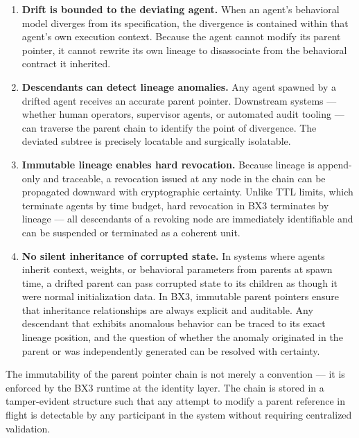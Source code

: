 \begin{enumerate}
    \item \textbf{Drift is bounded to the deviating agent.} When an agent's behavioral model diverges from its specification, the divergence is contained within that agent's own execution context. Because the agent cannot modify its parent pointer, it cannot rewrite its own lineage to disassociate from the behavioral contract it inherited.
    \item \textbf{Descendants can detect lineage anomalies.} Any agent spawned by a drifted agent receives an accurate parent pointer. Downstream systems — whether human operators, supervisor agents, or automated audit tooling — can traverse the parent chain to identify the point of divergence. The deviated subtree is precisely locatable and surgically isolatable.
    \item \textbf{Immutable lineage enables hard revocation.} Because lineage is append-only and traceable, a revocation issued at any node in the chain can be propagated downward with cryptographic certainty. Unlike TTL limits, which terminate agents by time budget, hard revocation in BX3 terminates by lineage — all descendants of a revoking node are immediately identifiable and can be suspended or terminated as a coherent unit.
    \item \textbf{No silent inheritance of corrupted state.} In systems where agents inherit context, weights, or behavioral parameters from parents at spawn time, a drifted parent can pass corrupted state to its children as though it were normal initialization data. In BX3, immutable parent pointers ensure that inheritance relationships are always explicit and auditable. Any descendant that exhibits anomalous behavior can be traced to its exact lineage position, and the question of whether the anomaly originated in the parent or was independently generated can be resolved with certainty.
\end{enumerate}

The immutability of the parent pointer chain is not merely a convention — it is enforced by the BX3 runtime at the identity layer. The chain is stored in a tamper-evident structure such that any attempt to modify a parent reference in flight is detectable by any participant in the system without requiring centralized validation.



